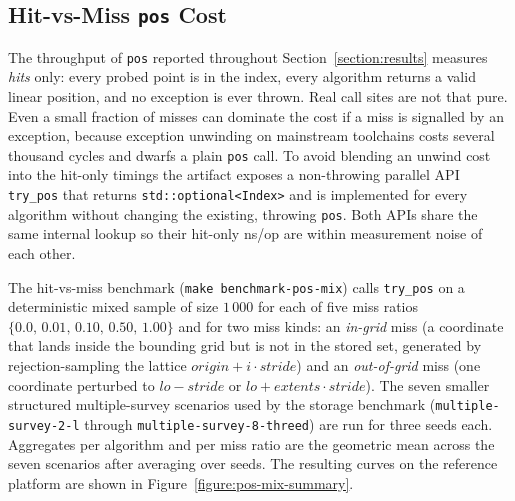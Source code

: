 \documentclass[manuscript,screen,review]{acmart}
\theoremstyle{definition}
\theoremstyle{plain}
\begin{document}
\begin{table}[ht]
\centering
\caption{Persistence summary on the EPYC~9454 reference platform
  (geometric mean across the seven smaller structured
  multiple-survey scenarios,
  \texttt{c0r1e1l0}, greedy-plus-merge). Each metric is reported with its value and
  ratio relative to the default \textsc{IPT} value. Bold values mark
  the best entry in each metric column. Bold ratios indicate results
  strictly better than \textsc{IPT}.}
\label{table:storage-summary}
{\footnotesize}
\end{table}

\subsection{Hit-vs-Miss \texttt{pos} Cost}
\label{section:results-pos-mix}

The throughput of \texttt{pos} reported throughout
Section~\ref{section:results} measures \emph{hits} only: every probed
point is in the index, every algorithm returns a valid linear
position, and no exception is ever thrown. Real call sites are not
that pure. Even a small fraction of misses can dominate the cost if a
miss is signalled by an exception, because exception unwinding on
mainstream toolchains costs several thousand cycles and dwarfs a
plain \texttt{pos} call. To avoid blending an unwind cost into the
hit-only timings the artifact exposes a non-throwing parallel API
\texttt{try\_pos} that returns \texttt{std::optional<Index>} and is
implemented for every algorithm without changing the existing,
throwing \texttt{pos}. Both APIs share the same internal lookup so
their hit-only ns/op are within measurement noise of each other.

The hit-vs-miss benchmark (\texttt{make benchmark-pos-mix}) calls
\texttt{try\_pos} on a deterministic mixed sample of size
$1\,000$ for each of five miss ratios
$\{0.0,\,0.01,\,0.10,\,0.50,\,1.00\}$ and for two miss kinds: an
\emph{in-grid} miss (a coordinate that lands inside the bounding grid but
is not in the stored set, generated by rejection-sampling the lattice
$origin + i\cdot stride$) and an \emph{out-of-grid} miss (one
coordinate perturbed to $lo - stride$ or $lo + extents\cdot stride$).
The seven smaller structured multiple-survey scenarios used by the
storage benchmark
(\texttt{multiple-survey-2-l} through \texttt{multiple-survey-8-threed})
are run for three seeds each. Aggregates per algorithm and per miss
ratio are the geometric mean across the seven scenarios after
averaging over seeds. The resulting curves on the reference platform
are shown in Figure~\ref{figure:pos-mix-summary}.
\end{document}

